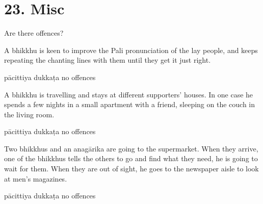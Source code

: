 \chapter{23. Misc}
\renewcommand*{\theChapterTitle}{23. Misc}

\begin{exam}{\autoExamName}

  \begin{problem*}

    Are there offences?

    \begin{parts}

      \item A bhikkhu is keen to improve the Pali pronunciation of the lay
      people, and keeps repeating the chanting lines with them until they get it
      just right.

      \bigskip

      \begin{answers}{3}
        \bChoices
         pācittiya\eAns
         dukkaṭa\eAns
         no offences\eAns
        \eChoices
      \end{answers}

      \bigskip

      \item A bhikkhu is travelling and stays at different supporters' houses.
      In one case he spends a few nights in a small apartment with a friend,
      sleeping on the couch in the living room.

      \bigskip

      \begin{answers}{3}
        \bChoices
         pācittiya\eAns
         dukkaṭa\eAns
         no offences\eAns
        \eChoices
      \end{answers}

      \bigskip

      \item Two bhikkhus and an anagārika are going to the supermarket. When
      they arrive, one of the bhikkhus tells the others to go and find what they
      need, he is going to wait for them. When they are out of sight, he goes to
      the newspaper aisle to look at men's magazines.

      \bigskip

      \begin{answers}{3}
        \bChoices
         pācittiya\eAns
         dukkaṭa\eAns
         no offences\eAns
        \eChoices
      \end{answers}


\end{parts}
\end{problem*}
\end{exam}
